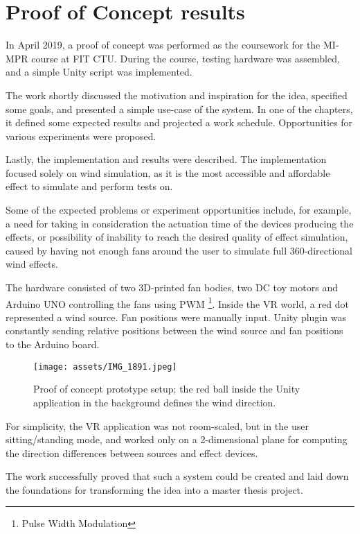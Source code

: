 \chapter{Proof of Concept results}

In April 2019, a proof of concept was performed as the coursework for the MI-MPR
course at FIT CTU. During the course, testing hardware was assembled,
and a simple Unity script was implemented.


The work shortly discussed the motivation and inspiration for the idea,
specified some goals, and presented a simple use-case of the system. In one of the
chapters, it defined some expected results and projected a work schedule.
Opportunities for various experiments were proposed.


Lastly, the implementation and results were described. The implementation
focused solely on wind simulation, as it is the most accessible and affordable
effect to simulate and perform tests on.


Some of the expected problems or experiment opportunities include, for example,
a need for taking in consideration the actuation time of the devices producing
the effects, or possibility of inability to reach the desired quality of effect
simulation, caused by having not enough fans around the user to simulate
full 360-directional wind effects.


The hardware consisted of two 3D-printed fan bodies, two DC toy motors and Arduino
UNO controlling the fans using PWM \footnote{Pulse Width Modulation}. Inside
the VR world, a red dot represented a wind source. Fan positions were manually
input. Unity plugin was constantly sending relative positions between the
wind source and fan positions to the Arduino board.


\begin{figure}[h]{}
\centering\texttt{[image: assets/IMG\_1891.jpeg]}
\caption{
    Proof of concept prototype setup; the red ball inside the Unity application in the background defines the wind direction.
}
\end{figure}

For simplicity, the VR application was not room-scaled, but in the
user sitting/standing mode, and worked only on a 2-dimensional plane for
computing the direction differences between sources and effect devices.


The work successfully proved that such a system could be created and laid down
the foundations for transforming the idea into a master thesis project.

